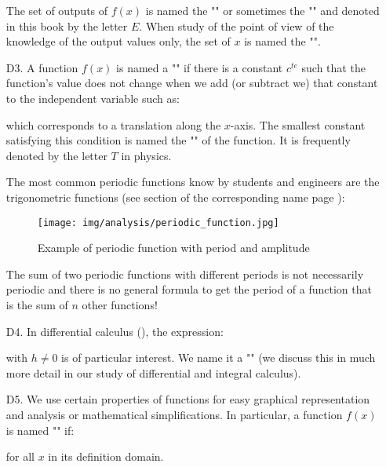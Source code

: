 \begin{enumerate}
		The set of outputs of $f(x)$ is named the "" or sometimes the "" and denoted in this book by the letter $E$. When study of the point of view of the knowledge of the output values only, the set of $x$ is named the "".
		
		\item[D3.] A function $f(x)$ is named a "" if there is a constant $c^{te}$ such that the function's value does not change when we add (or subtract we) that constant to the independent variable such as:
		
		which corresponds to a translation along the $x$-axis. The smallest constant satisfying this condition is named the "" of the function. It is frequently denoted by the letter $T$ in physics.
		
		The most common periodic functions know by students and engineers are the trigonometric functions (see section of the corresponding name page \pageref{trigonometry}):
		\begin{figure}[H]
			\centering
			\texttt{[image: img/analysis/periodic\_function.jpg]}
			\caption{Example of periodic function with period and amplitude}
		\end{figure}
		 \begin{tcolorbox}[title=Remark,colframe=black,arc=10pt]
		The sum of two periodic functions with different periods is not necessarily periodic and there is no general formula to get the period of a function that is the sum of $n$ other functions!
		\end{tcolorbox}
		
		\item[D4.] In differential calculus (), the expression:
		
		with $h\neq 0$ is of particular interest. We name it a "" (we discuss this in much more detail in our study of differential and integral calculus).
		
		\item[D5.] We use certain properties of functions for easy graphical representation and analysis or mathematical simplifications. In particular, a function $f (x)$ is named "\label{even function}" if:
		
		for all $x$ in its definition domain.
		

\end{enumerate}
